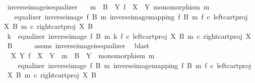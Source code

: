 \begin{isabellebody}
\ inverse{\isacharunderscore}{\kern0pt}image{\isacharunderscore}{\kern0pt}is{\isacharunderscore}{\kern0pt}equalizer{}{\isacharcolon}{\kern0pt}\isanewline
\ \ \ {\isachardoublequoteopen}m\ {\isacharcolon}{\kern0pt}\ B\ {\isasymrightarrow}\ Y{\isachardoublequoteclose}\ {\isachardoublequoteopen}f\ {\isacharcolon}{\kern0pt}\ X\ {\isasymrightarrow}\ Y{\isachardoublequoteclose}\ {\isachardoublequoteopen}monomorphism\ m{\isachardoublequoteclose}\isanewline
\ \ \ {\isachardoublequoteopen}equalizer\ {\isacharparenleft}{\kern0pt}inverse{\isacharunderscore}{\kern0pt}image\ f\ B\ m{\isacharparenright}{\kern0pt}\ {\isacharparenleft}{\kern0pt}inverse{\isacharunderscore}{\kern0pt}image{\isacharunderscore}{\kern0pt}mapping\ f\ B\ m{\isacharparenright}{\kern0pt}\ {\isacharparenleft}{\kern0pt}f\ {\isasymcirc}\isactrlsub c\ left{\isacharunderscore}{\kern0pt}cart{\isacharunderscore}{\kern0pt}proj\ X\ B{\isacharparenright}{\kern0pt}\ {\isacharparenleft}{\kern0pt}m\ {\isasymcirc}\isactrlsub c\ right{\isacharunderscore}{\kern0pt}cart{\isacharunderscore}{\kern0pt}proj\ X\ B{\isacharparenright}{\kern0pt}{\isachardoublequoteclose}\isanewline
%
\isadelimproof
%
\endisadelimproof
%
\isatagproof
{}\isamarkupfalse%
\ {\isacharminus}{\kern0pt}\isanewline
\ \ \isamarkupfalse%
\ k\ \ {\isachardoublequoteopen}equalizer\ {\isacharparenleft}{\kern0pt}inverse{\isacharunderscore}{\kern0pt}image\ f\ B\ m{\isacharparenright}{\kern0pt}\ k\ {\isacharparenleft}{\kern0pt}f\ {\isasymcirc}\isactrlsub c\ left{\isacharunderscore}{\kern0pt}cart{\isacharunderscore}{\kern0pt}proj\ X\ B{\isacharparenright}{\kern0pt}\ {\isacharparenleft}{\kern0pt}m\ {\isasymcirc}\isactrlsub c\ right{\isacharunderscore}{\kern0pt}cart{\isacharunderscore}{\kern0pt}proj\ X\ B{\isacharparenright}{\kern0pt}{\isachardoublequoteclose}\isanewline
\ \ \ \ \isamarkupfalse%
\ assms\ inverse{\isacharunderscore}{\kern0pt}image{\isacharunderscore}{\kern0pt}is{\isacharunderscore}{\kern0pt}equalizer\ \isamarkupfalse%
\ blast\isanewline
\ \ \isamarkupfalse%
\ \isamarkupfalse%
\ {\isachardoublequoteopen}{\isasymexists}\ X\ Y{\isachardot}{\kern0pt}\ f\ {\isacharcolon}{\kern0pt}\ X\ {\isasymrightarrow}\ Y\ {\isasymand}\ m\ {\isacharcolon}{\kern0pt}\ B\ {\isasymrightarrow}\ Y\ {\isasymand}\ monomorphism\ m\ {\isasymand}\isanewline
\ \ \ \ equalizer\ {\isacharparenleft}{\kern0pt}inverse{\isacharunderscore}{\kern0pt}image\ f\ B\ m{\isacharparenright}{\kern0pt}\ {\isacharparenleft}{\kern0pt}inverse{\isacharunderscore}{\kern0pt}image{\isacharunderscore}{\kern0pt}mapping\ f\ B\ m{\isacharparenright}{\kern0pt}\ {\isacharparenleft}{\kern0pt}f\ {\isasymcirc}\isactrlsub c\ left{\isacharunderscore}{\kern0pt}cart{\isacharunderscore}{\kern0pt}proj\ X\ B{\isacharparenright}{\kern0pt}\ {\isacharparenleft}{\kern0pt}m\ {\isasymcirc}\isactrlsub c\ right{\isacharunderscore}{\kern0pt}cart{\isacharunderscore}{\kern0pt}proj\ X\ B{\isacharparenright}{\kern0pt}{\isachardoublequoteclose}\isanewline

\end{isabellebody}
